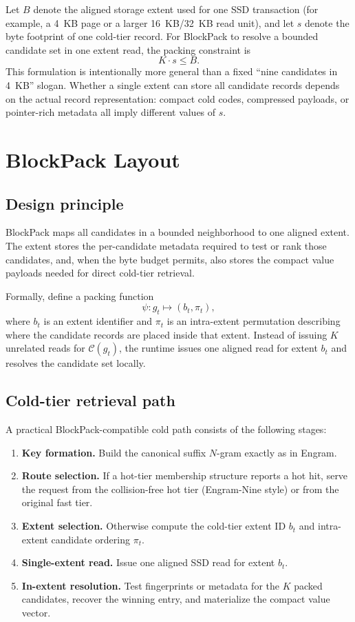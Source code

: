 \documentclass[11pt]{article}
\begin{document}
Let $B$ denote the aligned storage extent used for one SSD transaction (for example, a 4~KB page or a larger 16~KB/32~KB read unit), and let $s$ denote the byte footprint of one cold-tier record. For BlockPack to resolve a bounded candidate set in one extent read, the packing constraint is
\[
K \cdot s \leq B.
\]
This formulation is intentionally more general than a fixed ``nine candidates in 4~KB'' slogan. Whether a single extent can store all candidate records depends on the actual record representation: compact cold codes, compressed payloads, or pointer-rich metadata all imply different values of $s$.

\section{BlockPack Layout}
\subsection{Design principle}
BlockPack maps all candidates in a bounded neighborhood to one aligned extent. The extent stores the per-candidate metadata required to test or rank those candidates, and, when the byte budget permits, also stores the compact value payloads needed for direct cold-tier retrieval.

Formally, define a packing function
\[
\psi: g_t \mapsto (b_t, \pi_t),
\]
where $b_t$ is an extent identifier and $\pi_t$ is an intra-extent permutation describing where the candidate records are placed inside that extent. Instead of issuing $K$ unrelated reads for $\mathcal{C}(g_t)$, the runtime issues one aligned read for extent $b_t$ and resolves the candidate set locally.

\subsection{Cold-tier retrieval path}
A practical BlockPack-compatible cold path consists of the following stages:
\begin{enumerate}[leftmargin=1.5em]
    \item \textbf{Key formation.} Build the canonical suffix $N$-gram exactly as in Engram.
    \item \textbf{Route selection.} If a hot-tier membership structure reports a hot hit, serve the request from the collision-free hot tier (Engram-Nine style) or from the original fast tier.
    \item \textbf{Extent selection.} Otherwise compute the cold-tier extent ID $b_t$ and intra-extent candidate ordering $\pi_t$.
    \item \textbf{Single-extent read.} Issue one aligned SSD read for extent $b_t$.
    \item \textbf{In-extent resolution.} Test fingerprints or metadata for the $K$ packed candidates, recover the winning entry, and materialize the compact value vector.
\end{enumerate}
\end{document}
